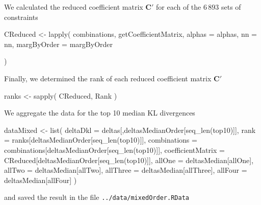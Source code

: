 \documentclass[
]{article}
\newenvironment{Shaded}{\begin{snugshade}}{\end{snugshade}}
\newcommand{\AttributeTok}[1]{\textcolor[rgb]{0.77,0.63,0.00}{#1}}
\newcommand{\FunctionTok}[1]{\textcolor[rgb]{0.00,0.00,0.00}{#1}}
\newcommand{\NormalTok}[1]{#1}
\newcommand{\OtherTok}[1]{\textcolor[rgb]{0.56,0.35,0.01}{#1}}
\begin{document}
We calculated the reduced coefficient matrix \(\mathbf{C}'\) for each of
the \(6\,893\) sets of constraints

\begin{Shaded}
\begin{Highlighting}[]
\NormalTok{CReduced }\OtherTok{\textless{}{-}} \FunctionTok{lapply}\NormalTok{(}
\NormalTok{    combinations,}
\NormalTok{    getCoefficientMatrix,}
    \AttributeTok{alphas =}\NormalTok{ alphas,}
    \AttributeTok{nn =}\NormalTok{ nn,}
    \AttributeTok{margByOrder =}\NormalTok{ margByOrder}
    
\NormalTok{)}
\end{Highlighting}
\end{Shaded}

Finally, we determined the rank of each reduced coefficient matrix
\(\mathbf{C}'\)

\begin{Shaded}
\begin{Highlighting}[]
\NormalTok{ranks }\OtherTok{\textless{}{-}} \FunctionTok{sapply}\NormalTok{(}
\NormalTok{    CReduced,}
\NormalTok{    Rank}
\NormalTok{)}
\end{Highlighting}
\end{Shaded}

We aggregate the data for the top 10 median \textsc{KL} divergences

\begin{Shaded}
\begin{Highlighting}[]
\NormalTok{dataMixed }\OtherTok{\textless{}{-}} \FunctionTok{list}\NormalTok{(}
    \AttributeTok{deltaDkl =}\NormalTok{ deltas[,deltasMedianOrder[}\FunctionTok{seq\_len}\NormalTok{(top10)]],}
    \AttributeTok{rank =}\NormalTok{ ranks[deltasMedianOrder[}\FunctionTok{seq\_len}\NormalTok{(top10)]],}
    \AttributeTok{combinations =}\NormalTok{ combinations[deltasMedianOrder[}\FunctionTok{seq\_len}\NormalTok{(top10)]],}
    \AttributeTok{coefficientMatrix =}\NormalTok{ CReduced[deltasMedianOrder[}\FunctionTok{seq\_len}\NormalTok{(top10)]],}
    \AttributeTok{allOne =}\NormalTok{ deltasMedian[allOne],}
    \AttributeTok{allTwo =}\NormalTok{ deltasMedian[allTwo],}
    \AttributeTok{allThree =}\NormalTok{ deltasMedian[allThree],}
    \AttributeTok{allFour =}\NormalTok{ deltasMedian[allFour]}
\NormalTok{)}
\end{Highlighting}
\end{Shaded}

and saved the result in the file \texttt{../data/mixedOrder.RData}
\end{document}
